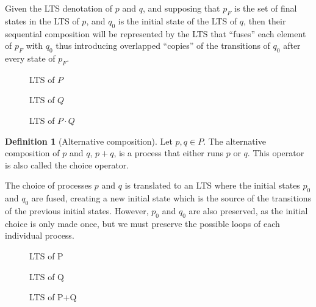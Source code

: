 \documentclass[11pt]{article}
\theoremstyle{definition}
\newtheorem{definition}{Definition}
\theoremstyle{plain}
\begin{document}
Given the LTS denotation of $ p $ and $ q $, and supposing that $ p_F $ is the set of final states in the LTS of $ p $, and $ q_0 $ is the initial state of the LTS of $ q $, then their sequential composition will be represented by the LTS that ``fuses'' each element of $ p_F $ with $ q_0 $ thus introducing overlapped ``copies'' of the transitions of $ q_0 $ after every state of $ p_F $.
\begin{figure}[H]
	\centering
	
	\caption{LTS of $ P $} \label{fig:SequentialCompositionP}
	\endminipage\hfill
	\centering
	
	\caption{LTS of $ Q $} \label{fig:SequentialCompositionQ}
	\endminipage\hfill
	\centering
	
	\caption{LTS of $ P\cdot Q $} \label{fig:SequentialCompositionPQ}
	\endminipage\hfill
\end{figure}

\begin{definition} [Alternative composition]
	Let $ p, q \in P$. The alternative composition of $ p $ and $ q $, $ p + q $, is a process that either runs $ p $ or $ q $. This operator is also called the choice operator.
\end{definition}

The choice of processes $ p $ and $ q $ is translated to an LTS where the initial states $ p_0 $ and $ q_0 $ are fused, creating a new initial state which is the source of the transitions of the previous initial states. However, $ p_0 $ and $ q_0 $ are also preserved, as the initial choice is only made once, but we must preserve the possible loops of each individual process.

\begin{figure}[H]
	\centering
	
	\caption{LTS of P} \label{fig:AlternativeCompositionP}
	\endminipage\hfill
	\centering
	
	\caption{LTS of Q} \label{fig:AlternativeCompositionQ}
	\endminipage\hfill
\end{figure}
\begin{figure} [H]
	\centering
	
	\caption{LTS of P+Q} \label{fig:AlternativeCompositionPQ}
\end{figure}
\end{document}
